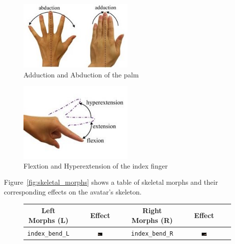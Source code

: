 \documentclass[../../main.tex]{subfiles}
\begin{document}
{\begin{figure}
    \centering
    \includegraphics[width=0.5\textwidth]{chapters/avatar_creation_pose_synthesis/images/adduction_abduction.jpg}
    \caption{Adduction and Abduction of the palm}
    \label{fig:adduction_abduction}
\end{figure}

\begin{figure}
    \centering
    \includegraphics[width=0.5\textwidth]{chapters/avatar_creation_pose_synthesis/images/hyper-extension_flexion.jpg}
    \caption{Flextion and Hyperextension of the index finger}
    \label{fig:hyper-extension_flexion}
\end{figure}

Figure~\ref{fig:skeletal_morphs} shows a table of skeletal morphs and their corresponding effects on the avatar's skeleton.

\begin{figure}
    \centering
    \begin{tabular}{|c|c|c|c|}
        \hline
        \textbf{Left Morphs (L)} & \textbf{Effect} & \textbf{Right Morphs (R)} & \textbf{Effect} \\ 
        \hline
        \texttt{index\_bend\_L} & \includegraphics[width=0.1\textwidth]{chapters/avatar_creation_pose_synthesis/images/morph_renders/index_bend_L_morph.png} & 
        \texttt{index\_bend\_R} & \includegraphics[width=0.1\textwidth]{chapters/avatar_creation_pose_synthesis/images/morph_renders/index_bend_R_morph.png} \\


\end{tabular}
\end{figure}}
\end{document}
